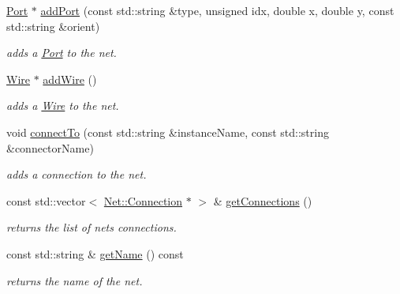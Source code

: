 \begin{DoxyCompactItemize}
\item 
\mbox{\hyperlink{class_open_chams_1_1_port}{Port}} $\ast$ \mbox{\hyperlink{class_open_chams_1_1_net_af395a7c9d6f3c2b24500b91260873664}{add\+Port}} (const std\+::string \&type, unsigned idx, double x, double y, const std\+::string \&orient)
\begin{DoxyCompactList}\small\item\em adds a \mbox{\hyperlink{class_open_chams_1_1_port}{Port}} to the net. \end{DoxyCompactList}\item 
\mbox{\hyperlink{class_open_chams_1_1_wire}{Wire}} $\ast$ \mbox{\hyperlink{class_open_chams_1_1_net_a643a969f62770301b8b70ed63c36a55e}{add\+Wire}} ()
\begin{DoxyCompactList}\small\item\em adds a \mbox{\hyperlink{class_open_chams_1_1_wire}{Wire}} to the net. \end{DoxyCompactList}\item 
void \mbox{\hyperlink{class_open_chams_1_1_net_a40c2c019175ba3bfa4b90f4ad5d06483}{connect\+To}} (const std\+::string \&instance\+Name, const std\+::string \&connector\+Name)
\begin{DoxyCompactList}\small\item\em adds a connection to the net. \end{DoxyCompactList}\item 
\mbox{\label{class_open_chams_1_1_net_a87e7c71b25171dd479af0488865c8179}} 
const std\+::vector$<$ \mbox{\hyperlink{class_open_chams_1_1_net_1_1_connection}{Net\+::\+Connection}} $\ast$ $>$ \& \mbox{\hyperlink{class_open_chams_1_1_net_a87e7c71b25171dd479af0488865c8179}{get\+Connections}} ()
\begin{DoxyCompactList}\small\item\em returns the list of net\textquotesingle{}s connections. \end{DoxyCompactList}\item 
\mbox{\label{class_open_chams_1_1_net_a3fd7335faa33dce2f87c7e50eef3e294}} 
const std\+::string \& \mbox{\hyperlink{class_open_chams_1_1_net_a3fd7335faa33dce2f87c7e50eef3e294}{get\+Name}} () const
\begin{DoxyCompactList}\small\item\em returns the name of the net. \end{DoxyCompactList}\item 

\end{DoxyCompactItemize}
